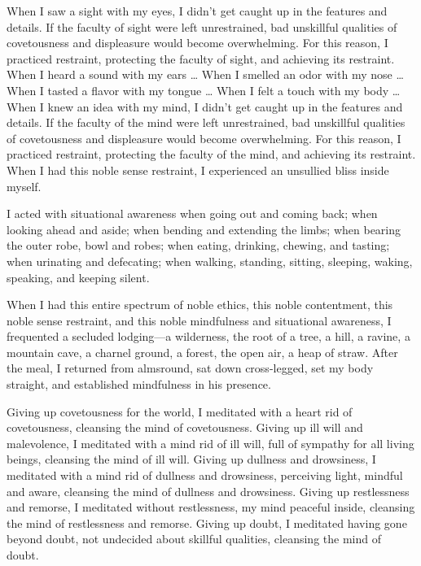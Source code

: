 \documentclass[12pt,openany]{book}%
\begin{document}
When I saw a sight with my eyes, I didn’t get caught up in the features and details. If the faculty of sight were left unrestrained, bad unskillful qualities of covetousness and displeasure would become overwhelming. For this reason, I practiced restraint, protecting the faculty of sight, and achieving its restraint. When I heard a sound with my ears … When I smelled an odor with my nose … When I tasted a flavor with my tongue … When I felt a touch with my body … When I knew an idea with my mind, I didn’t get caught up in the features and details. If the faculty of the mind were left unrestrained, bad unskillful qualities of covetousness and displeasure would become overwhelming. For this reason, I practiced restraint, protecting the faculty of the mind, and achieving its restraint. When I had this noble sense restraint, I experienced an unsullied bliss inside myself. 

I acted with situational awareness when going out and coming back; when looking ahead and aside; when bending and extending the limbs; when bearing the outer robe, bowl and robes; when eating, drinking, chewing, and tasting; when urinating and defecating; when walking, standing, sitting, sleeping, waking, speaking, and keeping silent. 

When I had this entire spectrum of noble ethics, this noble contentment, this noble sense restraint, and this noble mindfulness and situational awareness, I frequented a secluded lodging—a wilderness, the root of a tree, a hill, a ravine, a mountain cave, a charnel ground, a forest, the open air, a heap of straw. After the meal, I returned from almsround, sat down cross-legged, set my body straight, and established mindfulness in his presence. 

Giving up covetousness for the world, I meditated with a heart rid of covetousness, cleansing the mind of covetousness. Giving up ill will and malevolence, I meditated with a mind rid of ill will, full of sympathy for all living beings, cleansing the mind of ill will. Giving up dullness and drowsiness, I meditated with a mind rid of dullness and drowsiness, perceiving light, mindful and aware, cleansing the mind of dullness and drowsiness. Giving up restlessness and remorse, I meditated without restlessness, my mind peaceful inside, cleansing the mind of restlessness and remorse. Giving up doubt, I meditated having gone beyond doubt, not undecided about skillful qualities, cleansing the mind of doubt. 
\end{document}

